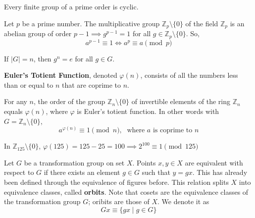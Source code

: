   \begin{corollary}
    Every finite group of a prime order is cyclic. 
  \end{corollary}

  \begin{theorem}
    Let $p$ be a prime number. The multiplicative group $\mathbb{Z}_{p} \setminus \{0\}$ of the field $\mathbb{Z}_{p}$ is an abelian group of order $p-1 \implies g^{p-1} = 1$ for all $g \in \mathbb{Z}_{p} \setminus \{0\}$. So,
    \begin{equation}
      a^{p-1} \equiv 1 \iff a^{p} \equiv a \pmod{p}
    \end{equation}
  \end{theorem}

  \begin{corollary}
    If $|G| = n$, then $g^{n} = e$ for all $g \in G$. 
  \end{corollary}

  \begin{definition}
    \textbf{Euler's Totient Function}, denoted $\varphi(n)$, consists of all the numbers less than or equal to $n$ that are coprime to $n$. 
  \end{definition}

  \begin{theorem}
    For any $n$, the order of the group $\mathbb{Z}_{n} \setminus \{0\}$ of invertible elements of the ring $\mathbb{Z}_{n}$ equals $\varphi(n)$, where $\varphi$ is Euler's totient function. In other words with $G = \mathbb{Z}_{n} \setminus \{0\}$, 
    \begin{equation}
      a^{\varphi(n)} \equiv 1 \pmod{n}, \; \text{ where $a$ is coprime to $n$}
    \end{equation}
  \end{theorem}

  \begin{example}
    In $\mathbb{Z}_{125} \setminus \{0\}$, $\varphi(125) = 125 - 25 = 100 \implies 2^{100} \equiv 1 \pmod{125}$
  \end{example}

  \begin{definition}
    Let $G$ be a transformation group on set $X$. Points $x, y \in X$ are equivalent with respect to $G$ if there exists an element $g \in G$ such that $y = g x$. This has already been defined through the equivalence of figures before. This relation splits $X$ into equivalence classes, called \textbf{orbits}. Note that cosets are the equivalence classes of the transformation group $G$; oribits are those of $X$. We denote it as
    \begin{equation}
      Gx \equiv \{ g x \;|\;g \in G \}
    \end{equation}
  \end{definition}

